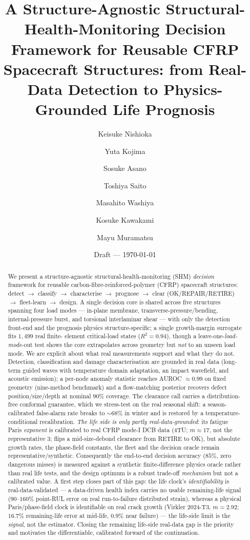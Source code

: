 \documentclass[11pt]{article}
\title{A Structure-Agnostic Structural-Health-Monitoring Decision Framework for
Reusable CFRP Spacecraft Structures: from Real-Data Detection to
Physics-Grounded Life Prognosis}
\author{Keisuke Nishioka \and Yuta Kojima \and Sosuke Asano \and Toshiya Saito
\and Masahito Washiya \and Kosuke Kawakami \and Mayu Muramatsu}
\date{Draft --- \today}
\begin{document}
\maketitle

\begin{abstract}
We present a structure-agnostic structural-health-monitoring (SHM) \emph{decision}
framework for reusable carbon-fibre-reinforced-polymer (CFRP) spacecraft
structures: detect $\to$ classify $\to$ characterise $\to$ prognose $\to$ clear
(OK/REPAIR/RETIRE) $\to$ fleet-learn $\to$ design. A single decision core is shared
across five structures spanning four load modes --- in-plane membrane,
transverse-pressure/bending, internal-pressure burst, and torsional interlaminar
shear --- with only the detection front-end and the prognosis physics
structure-specific; a single growth-margin surrogate fits $1{,}499$ real finite-
element critical-load states ($R^2{=}0.94$), though a leave-one-\emph{load-mode}-out
test shows the core extrapolates across geometry but \emph{not} to an unseen load
mode. We are explicit about what real measurements support and what they do not.
Detection, classification and damage characterisation are grounded in real data
(long-term guided waves with temperature domain adaptation, an impact wavefield,
and acoustic emission); a per-node anomaly statistic reaches AUROC $\approx0.99$ on
fixed geometry (nine-method benchmark) and a flow-matching posterior recovers
defect position/size/depth at nominal $90\%$ coverage. The clearance call carries
a distribution-free conformal guarantee, which we stress-test on the real seasonal
shift: a season-calibrated false-alarm rate breaks to $\sim$$68\%$ in winter and is
restored by a temperature-conditional recalibration. \emph{The life side is only partly
real-data-grounded}: its fatigue Paris \emph{exponent} is calibrated to real CFRP
mode-I DCB data (4TU; $m\!\approx\!17$, not the representative $3$; flips a
mid-size-debond clearance from RETIRE to OK), but absolute growth rates, the
phase-field constants, the fleet and the decision oracle remain
representative/synthetic. Consequently
the end-to-end decision accuracy ($85\%$, zero dangerous misses) is measured against
a synthetic finite-difference physics oracle rather than real life tests, and the
design optimum is a robust trade-off \emph{mechanism} but not a calibrated value.
A first step closes part of this gap: the life clock's \emph{identifiability} is
real-data-validated --- a data-driven health index carries no usable remaining-life
signal ($90$--$160\%$ point-RUL error on real run-to-failure distributed strain),
whereas a physical Paris/phase-field clock is identifiable on real crack growth
(Virkler 2024-T3, $m{=}2.92$; $16.7\%$ remaining-life error at mid-life, $0.9\%$ near
failure) --- the life-side limit is the \emph{signal}, not the estimator.
Closing the remaining life-side real-data gap is the priority and motivates the
differentiable, calibrated forward of the continuation.
\end{abstract}
\end{document}
